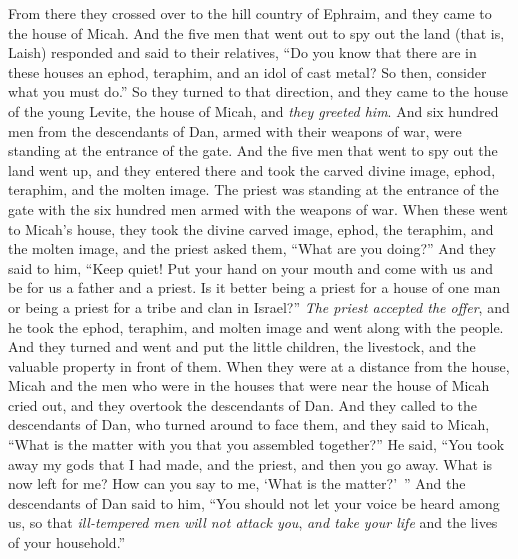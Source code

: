 \begin{biblechapter}
\verse From there they crossed over to the hill country of Ephraim, and they came to the house of Micah.
\verse And the five men that went out to spy out the land (that is, Laish) responded and said to their relatives, “Do you know that there are in these houses an ephod, teraphim, and an idol of cast metal? So then, consider what you must do.”
\verse So they turned to that direction, and they came to the house of the young Levite, the house of Micah, and \textit{they greeted him}.
\verse And six hundred men from the descendants of Dan, armed with their weapons of war, were standing at the entrance of the gate.
\verse And the five men that went to spy out the land went up, and they entered there and took the carved divine image, ephod, teraphim, and the molten image. The priest was standing at the entrance of the gate with the six hundred men armed with the weapons of war.
\verse When these went to Micah’s house, they took the divine carved image, ephod, the teraphim, and the molten image, and the priest asked them, “What are you doing?”
\verse And they said to him, “Keep quiet! Put your hand on your mouth and come with us and be for us a father and a priest. Is it better being a priest for a house of one man or being a priest for a tribe and clan in Israel?”
\verse \textit{The priest accepted the offer}, and he took the ephod, teraphim, and molten image and went along with the people.
\verse And they turned and went and put the little children, the livestock, and the valuable property in front of them.
\verse When they were at a distance from the house, Micah and the men who were in the houses that were near the house of Micah cried out, and they overtook the descendants of Dan.
\verse And they called to the descendants of Dan, who turned around to face them, and they said to Micah, “What is the matter with you that you assembled together?”
\verse He said, “You took away my gods that I had made, and the priest, and then you go away. What is now left for me? How can you say to me, ‘What is the matter?’ ”
\verse And the descendants of Dan said to him, “You should not let your voice be heard among us, so that \textit{ill-tempered men} \textit{will not attack you}, \textit{and take your life} and the lives of your household.”

\end{biblechapter}
